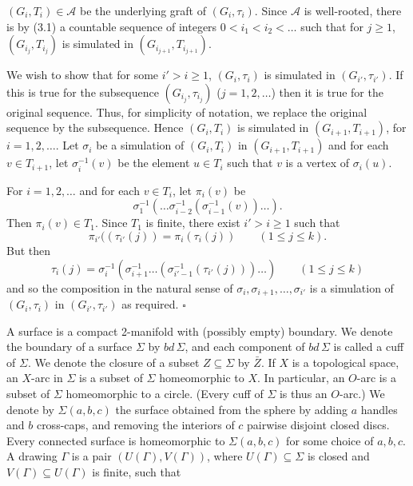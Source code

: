 \noindent $(G_i, T_i) \in \mathscr{A}$ be the underlying graft of $(G_i, \tau_i)$. Since $\mathscr{A}$ is well-rooted, there is by (3.1) a countable sequence of integers $0 < i_1 < i_2 < \dots$ such that for $j \ge 1$, $(G_{i_j}, T_{i_j})$ is simulated in $(G_{i_{j+1}}, T_{i_{j+1}})$.

We wish to show that for some $i' > i \ge 1$, $(G_i, \tau_i)$ is simulated in $(G_{i'}, \tau_{i'})$. If this is true for the subsequence $(G_{i_j}, \tau_{i_j})$ ($j = 1, 2, \dots$) then it is true for the original sequence. Thus, for simplicity of notation, we replace the original sequence by the subsequence. Hence $(G_i, T_i)$ is simulated in $(G_{i+1}, T_{i+1})$, for $i = 1, 2, \dots$. Let $\sigma_i$ be a simulation of $(G_i, T_i)$ in $(G_{i+1}, T_{i+1})$ and for each $v \in T_{i+1}$, let $\sigma_i^{-1}(v)$ be the element $u \in T_i$ such that $v$ is a vertex of $\sigma_i(u)$.

For $i = 1, 2, \dots$ and for each $v \in T_i$, let $\pi_i(v)$ be
\begin{equation*}
\sigma_1^{-1}(\dots \sigma_{i-2}^{-1}(\sigma_{i-1}^{-1}(v))\dots).
\end{equation*}
Then $\pi_i(v) \in T_1$. Since $T_1$ is finite, there exist $i' > i \ge 1$ such that
\begin{equation*}
\pi_{i'}((\tau_{i'}(j)) = \pi_i(\tau_i(j)) \qquad (1 \le j \le k).
\end{equation*}
But then
\begin{equation*}
\tau_i(j) = \sigma_i^{-1}(\sigma_{i+1}^{-1}\dots (\sigma_{i'-1}^{-1}(\tau_{i'}(j)))\dots) \qquad (1 \le j \le k)
\end{equation*}
and so the composition in the natural sense of $\sigma_i, \sigma_{i+1}, \dots, \sigma_{i'}$ is a simulation of $(G_i, \tau_i)$ in $(G_{i'}, \tau_{i'})$ as required. $\square$


A surface is a compact 2-manifold with (possibly empty) boundary. We denote the boundary of a surface $\Sigma$ by $bd \, \Sigma$, and each component of $bd \, \Sigma$ is called a cuff of $\Sigma$. We denote the closure of a subset $Z \subseteq \Sigma$ by $\bar{Z}$. If $X$ is a topological space, an $X$-arc in $\Sigma$ is a subset of $\Sigma$ homeomorphic to $X$. In particular, an $O$-arc is a subset of $\Sigma$ homeomorphic to a circle. (Every cuff of $\Sigma$ is thus an $O$-arc.) We denote by $\Sigma(a, b, c)$ the surface obtained from the sphere by adding $a$ handles and $b$ cross-caps, and removing the interiors of $c$ pairwise disjoint closed discs. Every connected surface is homeomorphic to $\Sigma(a, b, c)$ for some choice of $a, b, c$. A drawing $\Gamma$ is a pair $(U(\Gamma), V(\Gamma))$, where $U(\Gamma) \subseteq \Sigma$ is closed and $V(\Gamma) \subseteq U(\Gamma)$ is finite, such that

